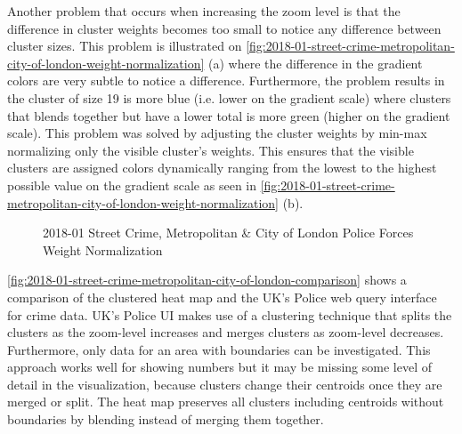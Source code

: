\documentclass[main.tex]{subfiles}
\begin{document}
Another problem that occurs when increasing the zoom level is that the difference in cluster weights becomes too small to notice any difference between cluster sizes. This problem is illustrated on \autoref{fig:2018-01-street-crime-metropolitan-city-of-london-weight-normalization} (a) where the difference in the gradient colors are very subtle to notice a difference. Furthermore, the problem results in the cluster of size 19 is more blue (i.e. lower on the gradient scale) where clusters that blends together but have a lower total is more green (higher on the gradient scale). This problem was solved by adjusting the cluster weights by min-max normalizing only the visible cluster's weights. This ensures that the visible clusters are assigned colors dynamically ranging from the lowest to the highest possible value on the gradient scale as seen in \autoref{fig:2018-01-street-crime-metropolitan-city-of-london-weight-normalization} (b).

\begin{figure}[H]
    \centering
    \caption{2018-01 Street Crime, Metropolitan \& City of London Police Forces Weight Normalization}
    \label{fig:2018-01-street-crime-metropolitan-city-of-london-weight-normalization}
\end{figure}

\autoref{fig:2018-01-street-crime-metropolitan-city-of-london-comparison} shows a comparison of the clustered heat map and the UK's Police web query interface for crime data. UK's Police UI makes use of a clustering technique that splits the clusters as the zoom-level increases and merges clusters as zoom-level decreases. Furthermore, only data for an area with boundaries can be investigated. This approach works well for showing numbers but it may be missing some level of detail in the visualization, because clusters change their centroids once they are merged or split. The heat map preserves all clusters including centroids without boundaries by blending instead of merging them together. 
\end{document}
